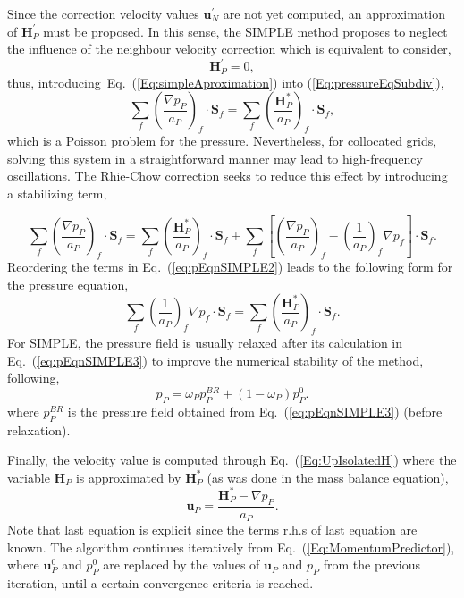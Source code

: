 \documentclass[final,3p,times,11pt,onecolumn]{myElsarticle}
\numberwithin{equation}{section}
\begin{document}
Since the correction velocity values $\boldsymbol{u}_N^{'}$  are not yet computed, an approximation of $\boldsymbol{H}_P^{'}$ must be proposed. In this sense, the SIMPLE method proposes to neglect the influence of the neighbour velocity correction which is equivalent to consider,
\begin{equation}
\label{Eq:simpleAproximation}
\boldsymbol{H}_P^{'} = 0,
\end{equation}
thus, introducing~Eq.~(\ref{Eq:simpleAproximation}) into (\ref{Eq:pressureEqSubdiv}),
\begin{equation}
\sum_{f} 
\left(
\dfrac
{
\nabla p_P}
{a_P}
\right)_f
\cdotp 
\textbf{S}_{f}
=
\sum_f 
\left(
\dfrac
{
\boldsymbol{H}_P^*
}
{
a_P
}
\right)_f
\cdot
\boldsymbol{S}_f,
\label{eq:div-free5}  
\end{equation}
which is a Poisson problem for the pressure. Nevertheless, for collocated grids, solving this system in a straightforward manner may lead to high-frequency oscillations. The Rhie-Chow correction \cite{rhiechow} seeks to reduce this effect by introducing a stabilizing term, 

\begin{equation}
\label{eq:pEqnSIMPLE2}
\sum_{f} 
\left(
\dfrac
{
\nabla p_P}
{a_P}
\right)_f
\cdotp 
\textbf{S}_{f} 
=
\sum_f 
\left(
\dfrac{
\boldsymbol{H}_P^*
}
{
a_P
}
\right)_f
\cdot
\boldsymbol{S}_f 
+
\sum_f  
\left[
\left(
\frac{\nabla p_P}{a_P}
\right)_f
- 
\left(
\frac{1}{a_P}
\right)_f 
\nabla p_f
\right]
\cdot 
\boldsymbol{S}_f.
\end{equation}
Reordering the terms in Eq.~(\ref{eq:pEqnSIMPLE2}) leads to the following form for the pressure equation,
\begin{equation}\label{eq:pEqnSIMPLE3}
\sum_f \left(\frac{1}{a_P}\right)_f \nabla p_f 
\cdot
\boldsymbol{S}_f 
=  \sum_f \left(\frac{\boldsymbol{H}_P^*}{a_P}\right)_f \cdot \boldsymbol{S}_f.
\end{equation}
For SIMPLE, the pressure field is usually relaxed after its calculation in Eq.~(\ref{eq:pEqnSIMPLE3}) to improve the numerical stability of the method, following,
\begin{equation}
\label{eq:relaxP}
p_P
=
\omega_P p_P^{BR} + (1-\omega_P) p_P^0.
\end{equation}
\noindent where $p_P^{BR}$ is the pressure field obtained from Eq.~(\ref{eq:pEqnSIMPLE3}) (before relaxation).

Finally, the velocity value is computed through Eq.~(\ref{Eq:UpIsolatedH}) where the variable $\boldsymbol{H}_P$ is approximated by $\boldsymbol{H}_P^{*}$ (as was done in the mass balance equation),
\begin{equation}
\label{eq:SIMPLECorr}
\boldsymbol{u}_P
=
\dfrac
{
\boldsymbol{H}_P^*
- 
\nabla p_P}
{a_P}.
\end{equation}
Note that last equation is explicit since the terms r.h.s of last equation are known. The algorithm continues iteratively from Eq.~(\ref{Eq:MomentumPredictor}), where $\boldsymbol{u}_P^0$ and $p_P^0$ are replaced by the values of $\boldsymbol{u}_P$ and $p_P$ from the previous iteration, until a certain convergence criteria is reached.
\end{document}
